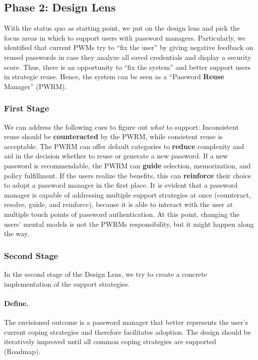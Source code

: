 \subsection{Phase 2: Design Lens}
With the status quo as starting point, we put on the design lens and pick the focus areas in which to support users with password managers. Particularly, we identified that current PWMs try to ``fix the user'' by giving negative feedback on reused passwords in case they analyze all saved credentials and display a security score. Thus, there is an opportunity to ``fix the system'' and better support users in strategic reuse. Hence, the system can be seen as a ``Password \textbf{Reuse} Manager'' (PWRM). 

\subsubsection{First Stage}
We can address the following cues to figure out \textit{what} to support: Inconsistent reuse should be \textbf{counteracted} by the PWRM, while consistent reuse is acceptable. The PWRM can offer default categories to \textbf{reduce} complexity and aid in the decision whether to reuse or generate a new password. If a new password is recommendable, the PWRM can \textbf{guide} selection, memorization, and policy fulfillment. If the users realize the benefits, this can \textbf{reinforce} their choice to adopt a password manager in the first place. It is evident that a password manager is capable of addressing multiple support strategies at once (counteract, resolve, guide, and reinforce), because it is able to interact with the user at multiple touch points of password authentication. At this point, changing the users' mental models is not the PWRMs responsibility, but it might happen along the way. 

\subsubsection{Second Stage}
In the second stage of the Design Lens, we try to create a concrete implementation of the support strategies. 
\paragraph{Define.} The envisioned outcome is a password manager that better represents the user's current coping strategies and therefore facilitates adoption. The design should be iteratively improved until all common coping strategies are supported (Roadmap). 

